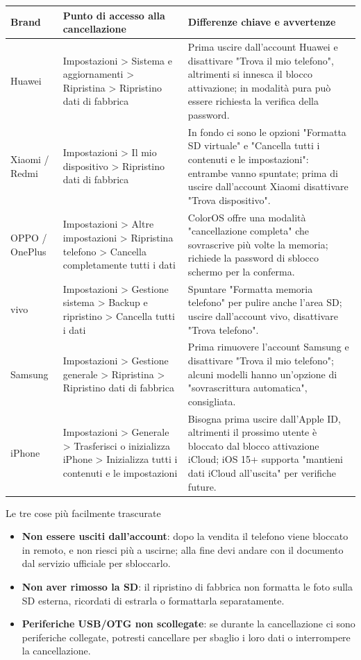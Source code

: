 \begin{center}
\begin{tabularx}{\linewidth}{|X|X|X|}
\hline
\textbf{Brand} & \textbf{Punto di accesso alla cancellazione} & \textbf{Differenze chiave e avvertenze} \tabularnewline
\hline
Huawei & Impostazioni > Sistema e aggiornamenti > Ripristina > Ripristino dati di fabbrica & Prima uscire dall'account Huawei e disattivare "Trova il mio telefono", altrimenti si innesca il blocco attivazione; in modalità pura può essere richiesta la verifica della password. \tabularnewline
Xiaomi / Redmi & Impostazioni > Il mio dispositivo > Ripristino dati di fabbrica & In fondo ci sono le opzioni "Formatta SD virtuale" e "Cancella tutti i contenuti e le impostazioni": entrambe vanno spuntate; prima di uscire dall'account Xiaomi disattivare "Trova dispositivo". \tabularnewline
OPPO / OnePlus & Impostazioni > Altre impostazioni > Ripristina telefono > Cancella completamente tutti i dati & ColorOS offre una modalità "cancellazione completa" che sovrascrive più volte la memoria; richiede la password di sblocco schermo per la conferma. \tabularnewline
vivo & Impostazioni > Gestione sistema > Backup e ripristino > Cancella tutti i dati & Spuntare "Formatta memoria telefono" per pulire anche l'area SD; uscire dall'account vivo, disattivare "Trova telefono". \tabularnewline
Samsung & Impostazioni > Gestione generale > Ripristina > Ripristino dati di fabbrica & Prima rimuovere l'account Samsung e disattivare "Trova il mio telefono"; alcuni modelli hanno un'opzione di "sovrascrittura automatica", consigliata. \tabularnewline
iPhone & Impostazioni > Generale > Trasferisci o inizializza iPhone > Inizializza tutti i contenuti e le impostazioni & Bisogna prima uscire dall'Apple ID, altrimenti il prossimo utente è bloccato dal blocco attivazione iCloud; iOS 15+ supporta "mantieni dati iCloud all'uscita" per verifiche future. \tabularnewline
\hline
\end{tabularx}
\end{center}

\begin{tcbwarn}{Le tre cose più facilmente trascurate}
\begin{itemize}
  \item \textbf{Non essere usciti dall'account}: dopo la vendita il telefono viene bloccato in remoto, e non riesci più a uscirne; alla fine devi andare con il documento dal servizio ufficiale per sbloccarlo.
  \item \textbf{Non aver rimosso la SD}: il ripristino di fabbrica non formatta le foto sulla SD esterna, ricordati di estrarla o formattarla separatamente.
  \item \textbf{Periferiche USB/OTG non scollegate}: se durante la cancellazione ci sono periferiche collegate, potresti cancellare per sbaglio i loro dati o interrompere la cancellazione.
\end{itemize}

\end{tcbwarn}

